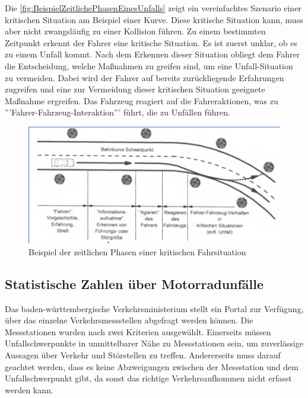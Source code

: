 Die \autoref{fig:BeispielZeitlichePhasenEinesUnfalls} zeigt ein vereinfachtes Szenario einer kritischen Situation am Beispiel einer Kurve. Diese kritische Situation kann, muss aber nicht zwangsläufig zu einer Kollision führen. Zu einem bestimmten Zeitpunkt erkennt der Fahrer eine kritische Situation. Es ist zuerst unklar, ob es zu einem Unfall kommt. Nach dem Erkennen dieser Situation obliegt dem Fahrer die Entscheidung, welche Maßnahmen zu greifen sind, um eine Unfall-Situation zu vermeiden. Dabei wird der Fahrer auf bereits zurückliegende Erfahrungen zugreifen und eine zur Vermeidung dieser kritischen Situation geeignete Maßnahme ergreifen. Das Fahrzeug reagiert auf die Fahreraktionen, was zu '''Fahrer-Fahrzeug-Interaktion''' führt, die zu Unfällen führen.\citep{Appel2002}\\


\begin{figure}[H]
	\centering
	\includegraphics[width=\linewidth]{Bilder/BeispielZeitlichePhasenEinesUnfalls.png}
	\caption{Beispiel der zeitlichen Phasen einer kritischen Fahrsituation \citep{Appel2002}}
	\label{fig:BeispielZeitlichePhasenEinesUnfalls}
\end{figure}

%
%
%
%
%

\subsection{Statistische Zahlen über Motorradunfälle}
Das baden-württembergische Verkehrsministerium stellt ein Portal zur Verfügung, über das einzelne Verkehrsmessstellen abgefragt werden können. Die Messstationen wurden nach zwei Kriterien ausgewählt. Einerseits müssen Unfallschwerpunkte in unmittelbarer Nähe zu Messstationen sein, um zuverlässige Aussagen über Verkehr und Störstellen zu treffen.
Andererseits muss darauf geachtet werden, dass es keine Abzweigungen zwischen der Messstation und dem Unfallschwerpunkt gibt, da sonst das richtige Verkehrsaufkommen nicht erfasst werden kann.

